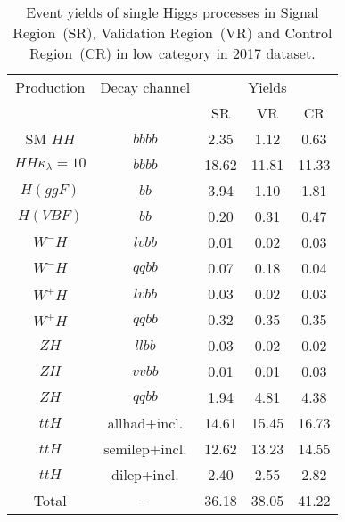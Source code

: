 
\begin{table}[h]
    \centering
    \caption{Event yields of single Higgs processes in Signal Region~(SR), Validation Region~(VR) 
             and Control Region~(CR) in low \pt category in 2017 dataset.}
    \vspace{1.5mm}
    \begin{tabular}{ccccc}
        \hline
        Production & Decay channel & \multicolumn{3}{c}{Yields} \\
                   &               & SR & VR & CR \\
        \hline
        SM $HH$                & $bbbb$ & 2.35 & 1.12 & 0.63 \\
        $HH \kappa_\lambda=10$ & $bbbb$ & 18.62 & 11.81 & 11.33 \\
        \hline
        $H (ggF)$  & $bb$          & 3.94 & 1.10 & 1.81 \\
        $H (VBF)$  & $bb$          & 0.20 & 0.31 & 0.47 \\
        $W^{-}H$   & $lvbb$        & 0.01 & 0.02 & 0.03 \\
        $W^{-}H$   & $qqbb$        & 0.07 & 0.18 & 0.04 \\
        $W^{+}H$   & $lvbb$        & 0.03 & 0.02 & 0.03 \\
        $W^{+}H$   & $qqbb$        & 0.32 & 0.35 & 0.35 \\
        $ZH$       & $llbb$        & 0.03 & 0.02  & 0.02 \\
        $ZH$       & $vvbb$        & 0.01 & 0.01 & 0.03 \\
        $ZH$       & $qqbb$        & 1.94 & 4.81 & 4.38 \\
        $ttH$      & allhad+incl.  & 14.61 & 15.45 & 16.73 \\
        $ttH$      & semilep+incl. & 12.62 & 13.23& 14.55 \\
        $ttH$      & dilep+incl.   & 2.40 & 2.55 & 2.82 \\
        \hline
        Total      & --            & 36.18 & 38.05 & 41.22 \\
    \end{tabular}
    \label{tabel:single-higgs-yields-lowpt}
\end{table}
